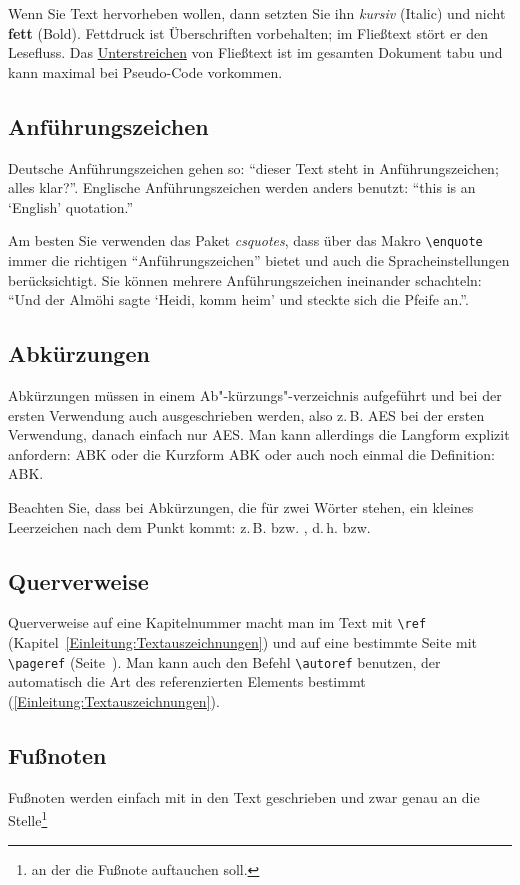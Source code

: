 \documentclass[conference,compsoc,final,a4paper]{IEEEtran}
\begin{document}
Wenn Sie Text hervorheben wollen, dann setzten Sie ihn \textit{kursiv} (Italic) und nicht \textbf{fett} (Bold). Fettdruck ist Überschriften vorbehalten; im Fließtext stört er den Lesefluss. Das \underline{Unterstreichen} von Fließtext ist im gesamten Dokument tabu und kann maximal bei Pseudo-Code vorkommen.

\subsection{Anführungszeichen}
Deutsche Anführungszeichen gehen so: "`dieser Text steht in \glq Anführungszeichen\grq; alles klar?"'. Englische Anführungszeichen werden anders benutzt: ``this is an `English' quotation.''

Am besten Sie verwenden das Paket \textit{csquotes}, dass über das Makro \lstinline+\enquote+ immer die richtigen \enquote{Anführungszeichen} bietet und auch die Spracheinstellungen berücksichtigt. Sie können mehrere Anführungszeichen ineinander schachteln: \enquote{Und der Almöhi sagte \enquote{Heidi, komm heim} und steckte sich die Pfeife an.}.

\subsection{Abkürzungen}
Abkürzungen müssen in einem Ab"-kürzungs"-verzeichnis aufgeführt und bei der ersten Verwendung auch ausgeschrieben werden, also z.\,B. \ac{AES} bei der ersten Verwendung, danach einfach nur \ac{AES}. Man kann allerdings die Langform explizit anfordern: \acl{ABK} oder die Kurzform \acs{ABK} oder auch noch einmal die Definition: \acf{ABK}.

Beachten Sie, dass bei Abkürzungen, die für zwei Wörter stehen, ein kleines Leerzeichen nach dem Punkt kommt: z.\,B. bzw. \zb, d.\,h. bzw. \dahe

\subsection{Querverweise}
Querverweise auf eine Kapitelnummer macht man im Text mit \lstinline+\ref+ (Kapitel~\ref{Einleitung:Textauszeichnungen}) und auf eine bestimmte Seite mit \lstinline+\pageref+ (Seite~\pageref{Einleitung:Textauszeichnungen}). Man kann auch den Befehl \lstinline+\autoref+ benutzen, der automatisch die Art des referenzierten Elements bestimmt (\zb \autoref{Einleitung:Textauszeichnungen}).

\subsection{Fußnoten}
Fußnoten werden einfach mit in den Text geschrieben und zwar genau an die Stelle\footnote{an der die Fußnote auftauchen soll.}
\end{document}
